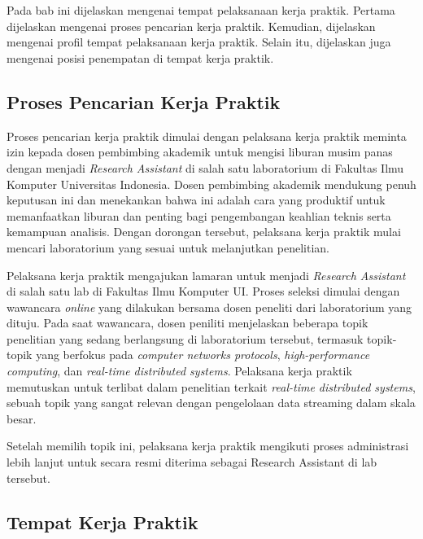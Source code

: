 \chapter{\babSatu}
\label{bab:1}

Pada bab ini dijelaskan mengenai tempat pelaksanaan kerja praktik. Pertama dijelaskan mengenai proses pencarian kerja praktik. Kemudian, dijelaskan mengenai profil tempat pelaksanaan kerja praktik. Selain itu, dijelaskan juga mengenai posisi penempatan di tempat kerja praktik.

\section{Proses Pencarian Kerja Praktik}
\label{sec:pencarian}

Proses pencarian kerja praktik dimulai dengan pelaksana kerja praktik meminta izin kepada dosen pembimbing akademik untuk mengisi liburan musim panas dengan menjadi \textit{Research Assistant} di salah satu laboratorium di Fakultas Ilmu Komputer Universitas Indonesia. Dosen pembimbing akademik mendukung penuh keputusan ini dan menekankan bahwa ini adalah cara yang produktif untuk memanfaatkan liburan dan penting bagi pengembangan keahlian teknis serta kemampuan analisis. Dengan dorongan tersebut, pelaksana kerja praktik mulai mencari laboratorium yang sesuai untuk melanjutkan penelitian.

Pelaksana kerja praktik mengajukan lamaran untuk menjadi \textit{Research Assistant} di salah satu lab di Fakultas Ilmu Komputer UI. Proses seleksi dimulai dengan wawancara \textit{online} yang dilakukan bersama dosen peneliti dari laboratorium yang dituju. Pada saat wawancara, dosen peniliti menjelaskan beberapa topik penelitian yang sedang berlangsung di laboratorium tersebut, termasuk topik-topik yang berfokus pada \textit{computer networks protocols}, \textit{high-performance computing}, dan \textit{real-time distributed systems}. Pelaksana kerja praktik memutuskan untuk terlibat dalam penelitian terkait \textit{real-time distributed systems}, sebuah topik yang sangat relevan dengan pengelolaan data streaming dalam skala besar.

Setelah memilih topik ini, pelaksana kerja praktik mengikuti proses administrasi lebih lanjut untuk secara resmi diterima sebagai Research Assistant di lab tersebut.

\section{Tempat Kerja Praktik}
\label{sec:tempat}

